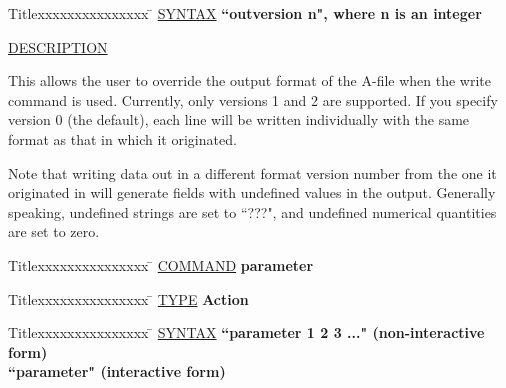 \begin{tabbing}
Titlexxxxxxxxxxxxxxx \= \kill
\underline{SYNTAX} \> {\bf 		``outversion n", where n is an integer} \\
\end{tabbing}

\underline{DESCRIPTION}
\begin{list}{}{\setlength{\leftmargin}{0.5in}
     \setlength{\rightmargin}{0in}}
\item
This allows the user to override the output format of the A-file when
the write command is used.  Currently, only versions 1 and 2 are
supported.  If you specify version 0 (the default), each line will
be written individually with the same format as that in which it
originated.
\item
Note that writing data out in a different format version number from
the one it originated in will generate fields with undefined values
in the output.  Generally speaking, undefined strings are set to ``???",
and undefined numerical quantities are set to zero.
\end{list}
\vspace{.2in}

\begin{tabbing}
Titlexxxxxxxxxxxxxxx \= \kill
\underline{COMMAND} \> {\bf 	parameter} \\
\end{tabbing}

\begin{tabbing}
Titlexxxxxxxxxxxxxxx \= \kill
\underline{TYPE} \> {\bf 		Action} \\
\end{tabbing}

\begin{tabbing}
Titlexxxxxxxxxxxxxxx \= \kill
\underline{SYNTAX} \> {\bf 		``parameter 1 2 3 ..."	(non-interactive form)} \\
\> {\bf 		``parameter"		(interactive form)} \\
\end{tabbing}

